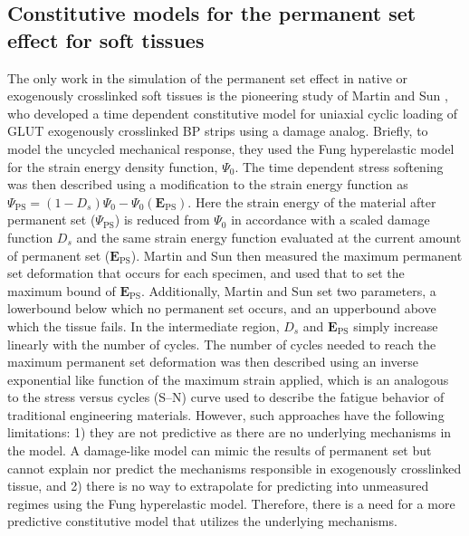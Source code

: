 		

\subsection{Constitutive models for the permanent set effect for soft tissues}

	The only work in the simulation of the permanent set effect in native or exogenously crosslinked soft tissues is the pioneering study of Martin and Sun \cite{martin_modeling_2013}, who developed a time dependent constitutive model for uniaxial cyclic loading of GLUT exogenously crosslinked BP strips using a damage analog. Briefly, to model the uncycled mechanical response, they used the Fung hyperelastic model for the strain energy density function, $\Psi_0$. The time dependent stress softening was then described using a modification to the strain energy function as $\Psi_\mathrm{PS} = (1-D_s)\Psi_0 - \Psi_0(\mathbf{E}_\mathrm{PS})$. Here the strain energy of the material after permanent set ($\Psi_\mathrm{PS}$) is reduced from $\Psi_0$ in accordance with a scaled damage function $D_s$ and the same strain energy function evaluated at the current amount of permanent set ($\mathbf{E}_\mathrm{PS}$). Martin and Sun then measured the maximum permanent set deformation that occurs for each specimen, and used that to set the maximum bound of $\mathbf{E}_\mathrm{PS}$. Additionally, Martin and Sun set two parameters, a lowerbound below which no permanent set occurs, and an upperbound above which the tissue fails. In the intermediate region, $D_s$ and $\mathbf{E}_\mathrm{PS}$ simply increase linearly with the number of cycles. The number of cycles needed to reach the maximum permanent set deformation was then described using an inverse exponential like function of the maximum strain applied, which is an analogous to the stress versus cycles (S–N) curve used to describe the fatigue behavior of traditional engineering materials. However, such approaches have the following limitations: 1) they are not predictive as there are no underlying mechanisms in the model. A damage-like model can mimic the results of permanent set but cannot explain nor predict the mechanisms responsible in exogenously crosslinked tissue, and 2) there is no way to extrapolate for predicting into unmeasured regimes using the Fung hyperelastic model. Therefore, there is a need for a more predictive constitutive model that utilizes the underlying mechanisms.


